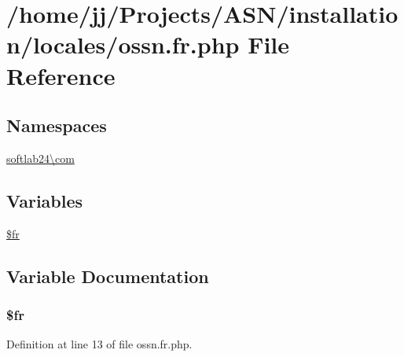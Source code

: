 \hypertarget{installation_2locales_2ossn_8fr_8php}{}\section{/home/jj/\+Projects/\+A\+S\+N/installation/locales/ossn.fr.\+php File Reference}
\label{installation_2locales_2ossn_8fr_8php}
\subsection*{Namespaces}
\begin{DoxyCompactItemize}
\item 
 \hyperlink{namespacesoftlab24_1_1com}{softlab24\textbackslash{}com}
\end{DoxyCompactItemize}
\subsection*{Variables}
\begin{DoxyCompactItemize}
\item 
\hyperlink{installation_2locales_2ossn_8fr_8php_ad5107c697816e7b7f89ad1b3e94e3e0e}{\$fr}
\end{DoxyCompactItemize}


\subsection{Variable Documentation}
\subsubsection[{\texorpdfstring{\$fr}{$fr}}]{\setlength{\rightskip}{0pt plus 5cm}\$fr}\hypertarget{installation_2locales_2ossn_8fr_8php_ad5107c697816e7b7f89ad1b3e94e3e0e}{}\label{installation_2locales_2ossn_8fr_8php_ad5107c697816e7b7f89ad1b3e94e3e0e}


Definition at line 13 of file ossn.\+fr.\+php.

